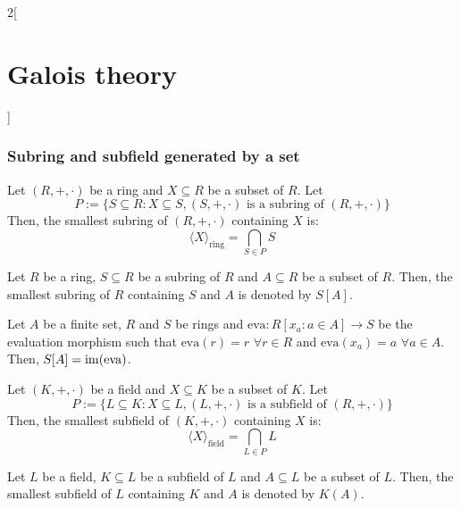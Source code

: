 \documentclass[../../../main.tex]{subfiles}
\begin{document}
\begin{multicols}{2}[\section{Galois theory}]
  \subsubsection*{Subring and subfield generated by a set}
  \begin{definition}
    Let $(R,+,\cdot)$ be a ring and $X\subseteq R$ be a subset of $R$. Let $$P:=\{S\subseteq R: X\subseteq S,(S,+,\cdot)\text{ is a subring of }(R,+,\cdot)\}$$ Then, the smallest subring of $(R,+,\cdot)$ containing $X$ is: $$\langle X\rangle_\text{ring}=\bigcap_{S\in P}S$$
  \end{definition}
  \begin{definition}
    Let $R$ be a ring, $S\subseteq R$ be a subring of $R$ and $A\subseteq R$ be a subset of $R$. Then, the smallest subring of $R$ containing $S$ and $A$ is denoted by $S[A]$.
  \end{definition}
  \begin{lemma}
    Let $A$ be a finite set, $R$ and $S$ be rings and $\text{eva}:R[x_a:a\in A]\rightarrow S$ be the evaluation morphism such that $\text{eva}(r)=r$ $\forall r\in R$ and $\text{eva}(x_a)=a$ $\forall a\in A$. Then, $S[A]=\operatorname{im}(\text{eva})$.
  \end{lemma}
  \begin{definition}
    Let $(K,+,\cdot)$ be a field and $X\subseteq K$ be a subset of $K$. Let $$P:=\{L\subseteq K: X\subseteq L,(L,+,\cdot)\text{ is a subfield of }(R,+,\cdot)\}$$ Then, the smallest subfield of $(K,+,\cdot)$ containing $X$ is: $$\langle X\rangle_\text{field}=\bigcap_{L\in P}L$$
  \end{definition}
  \begin{definition}
    Let $L$ be a field, $K\subseteq L$ be a subfield of $L$ and $A\subseteq L$ be a subset of $L$. Then, the smallest subfield of $L$ containing $K$ and $A$ is denoted by $K(A)$.
  \end{definition}

\end{multicols}
\end{document}
